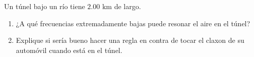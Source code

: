\item Un túnel bajo un río tiene $2.00\text{ km}$ de largo.
\begin{enumerate}
    \item ¿A qué frecuencias extremadamente bajas puede resonar el aire en el túnel?
    \item Explique si sería bueno hacer una regla en contra de tocar el claxon de su automóvil cuando está en el túnel.
\end{enumerate}